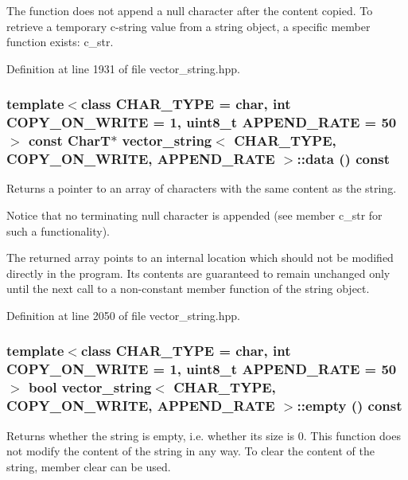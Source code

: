 The function does not append a null character after the content copied. To retrieve a temporary c-string value from a string object, a specific member function exists: c\_\-str. 

Definition at line 1931 of file vector\_\-string.hpp.\hypertarget{classvector__string_96e3871846c162930623048ce8e053f1}{
\subsubsection[{data}]{\setlength{\rightskip}{0pt plus 5cm}template$<$class CHAR\_\-TYPE  = char, int COPY\_\-ON\_\-WRITE = 1, uint8\_\-t APPEND\_\-RATE = 50$>$ const CharT$\ast$ {\bf vector\_\-string}$<$ CHAR\_\-TYPE, COPY\_\-ON\_\-WRITE, APPEND\_\-RATE $>$::data () const}}
\label{classvector__string_96e3871846c162930623048ce8e053f1}


Returns a pointer to an array of characters with the same content as the string.

Notice that no terminating null character is appended (see member c\_\-str for such a functionality).

The returned array points to an internal location which should not be modified directly in the program. Its contents are guaranteed to remain unchanged only until the next call to a non-constant member function of the string object. 

Definition at line 2050 of file vector\_\-string.hpp.\hypertarget{classvector__string_1b6ed56a2ebb354a819c4830ebb6c23b}{
\subsubsection[{empty}]{\setlength{\rightskip}{0pt plus 5cm}template$<$class CHAR\_\-TYPE  = char, int COPY\_\-ON\_\-WRITE = 1, uint8\_\-t APPEND\_\-RATE = 50$>$ bool {\bf vector\_\-string}$<$ CHAR\_\-TYPE, COPY\_\-ON\_\-WRITE, APPEND\_\-RATE $>$::empty () const}}
\label{classvector__string_1b6ed56a2ebb354a819c4830ebb6c23b}


Returns whether the string is empty, i.e. whether its size is 0. This function does not modify the content of the string in any way. To clear the content of the string, member clear can be used. 

